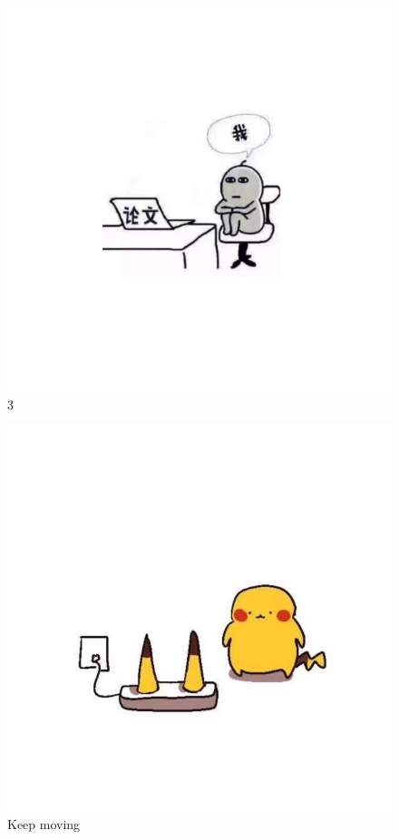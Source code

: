 \documentclass[
]{book}
\begin{document}
\begin{figure}
\centering
\includegraphics{./figs/Rongting/IMG-7418.JPG}
\caption{3}
\end{figure}

\begin{figure}
\centering
\includegraphics{./figs/Rongting/IMG-8010.JPG}
\caption{Keep moving}
\end{figure}
\end{document}
